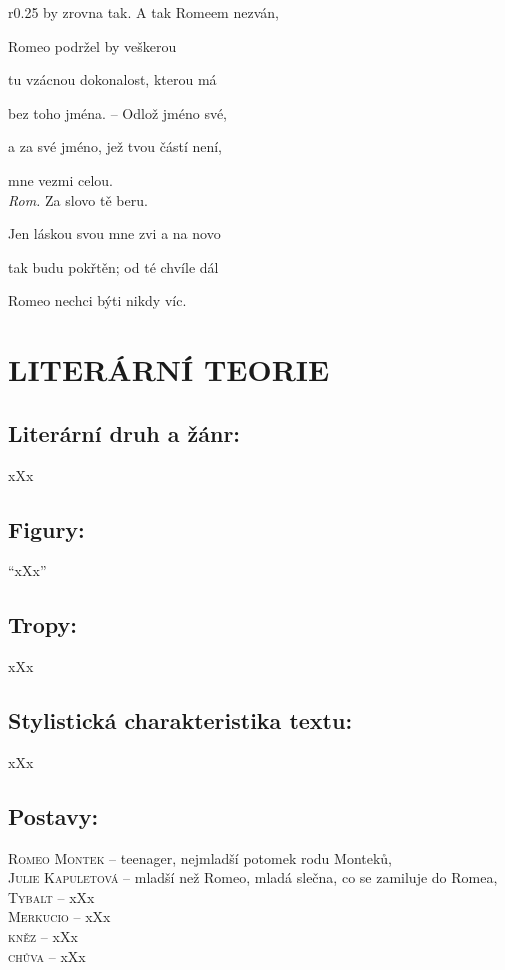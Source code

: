 \documentclass[A4paper]{extarticle} %
\begin{document}
\begin{wrapfigure}{r}{0.25\textwidth}
by zrovna tak. A tak Romeem nezván, \par
Romeo podržel by veškerou \par
tu vzácnou dokonalost, kterou má \par
bez toho jména. -- Odlož jméno své, \par
a za své jméno, jež tvou částí není, \par
mne vezmi celou. \\
\textit{Rom.} Za slovo tě beru. \par
Jen láskou svou mne zvi a na novo \par
tak budu pokřtěn; od té chvíle dál \par
Romeo nechci býti nikdy víc. 
\end{wrapfigure}

\section*{LITERÁRNÍ TEORIE}

\subsection*{Literární druh a žánr:}
\noindent xXx



\subsection*{Figury:}
\noindent 
\enquote{xXx}

\subsection*{Tropy:}
\noindent 
xXx

\subsection*{Stylistická charakteristika textu:}
\noindent 
xXx

\subsection*{Postavy:}
\noindent 
\textsc{Romeo Montek --} teenager, nejmladší potomek rodu Monteků,  \\
\textsc{Julie Kapuletová --} mladší než Romeo, mladá slečna, co se zamiluje do Romea, \\
\textsc{Tybalt --} xXx \\
\textsc{Merkucio --} xXx \\
\textsc{kněz --} xXx \\
\textsc{chůva --} xXx
\end{document}
